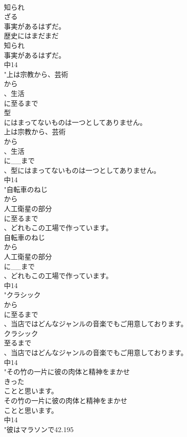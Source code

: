\documentclass[8pt]{extreport}
\begin{document}
\begin{CJK}{UTF8}{min}
\\	知られ
\\	ざる
\\	事実があるはずだ。
\\	歴史にはまだまだ
\\	知られ
\\	事実があるはずだ。
\\	中14
\\	"上は宗教から、芸術
\\	から
\\	、生活
\\	に至るまで
\\	型
\\	にはまってないものは一つとしてありません。
\\	上は宗教から、芸術
\\	から
\\	、生活
\\	に__まで
\\	、型にはまってないものは一つとしてありません。
\\	中14
\\	"自転車のねじ
\\	から
\\	人工衛星の部分
\\	に至るまで
\\	、どれもこの工場で作っています。
\\	自転車のねじ
\\	から
\\	人工衛星の部分
\\	に__まで
\\	、どれもこの工場で作っています。
\\	中14
\\	"クラシック
\\	から
\\	に至るまで
\\	、当店ではどんなジャンルの音楽でもご用意しております。
\\	クラシック
\\	至るまで
\\	、当店ではどんなジャンルの音楽でもご用意しております。
\\	中14
\\	"その竹の一片に彼の肉体と精神をまかせ
\\	きった
\\	ことと思います。
\\	その竹の一片に彼の肉体と精神をまかせ
\\	ことと思います。
\\	中14
\\	"彼はマラソンで42.195

\end{CJK}
\end{document}
